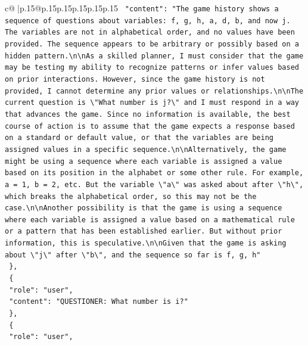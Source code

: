 \documentclass{article}
\begin{document}
{\begin{supertabular}{c@{$\;$}|p{.15\linewidth}@{}p{.15\linewidth}p{.15\linewidth}p{.15\linewidth}p{.15\linewidth}p{.15\linewidth}}
{{{\texttt{    "content": "The game history shows a sequence of questions about variables: f, g, h, a, d, b, and now j. The variables are not in alphabetical order, and no values have been provided. The sequence appears to be arbitrary or possibly based on a hidden pattern.\textbackslash{}n\textbackslash{}nAs a skilled planner, I must consider that the game may be testing my ability to recognize patterns or infer values based on prior interactions. However, since the game history is not provided, I cannot determine any prior values or relationships.\textbackslash{}n\textbackslash{}nThe current question is \textbackslash{}"What number is j?\textbackslash{}" and I must respond in a way that advances the game. Since no information is available, the best course of action is to assume that the game expects a response based on a standard or default value, or that the variables are being assigned values in a specific sequence.\textbackslash{}n\textbackslash{}nAlternatively, the game might be using a sequence where each variable is assigned a value based on its position in the alphabet or some other rule. For example, a = 1, b = 2, etc. But the variable \textbackslash{}"a\textbackslash{}" was asked about after \textbackslash{}"h\textbackslash{}", which breaks the alphabetical order, so this may not be the case.\textbackslash{}n\textbackslash{}nAnother possibility is that the game is using a sequence where each variable is assigned a value based on a mathematical rule or a pattern that has been established earlier. But without prior information, this is speculative.\textbackslash{}n\textbackslash{}nGiven that the game is asking about \textbackslash{}"j\textbackslash{}" after \textbackslash{}"b\textbackslash{}", and the sequence so far is f, g, h"} \\
\texttt{  \},} \\
\texttt{  \{} \\
\texttt{    "role": "user",} \\
\texttt{    "content": "QUESTIONER: What number is i?"} \\
\texttt{  \},} \\
\texttt{  \{} \\
\texttt{    "role": "user",} \\
}}}
\end{supertabular}}
\end{document}

